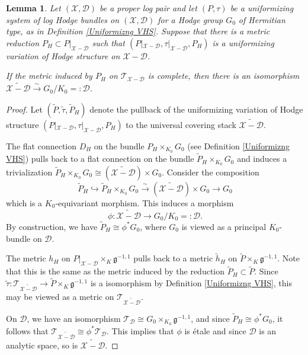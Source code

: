 \documentclass[a4paper]{amsart}
\newtheorem{lemma}[theorem]{Lemma}
\theoremstyle{definition}
\begin{document}
\begin{lemma}\label{Completeness-lem}
Let $(\mathscr{X},\mathscr{D})$ be a proper log pair and let $(P,\tau)$ be a uniformizing system of log Hodge bundles on $(\mathscr{X},\mathscr{D})$ for a Hodge group $G_0$ of Hermitian type, as in Definition \ref{Uniformizng VHS}. Suppose that there is a metric reduction $P_H\subset P|_{\mathscr{X}-\mathscr{D}}$ such that $(P|_{\mathscr{X}-\mathscr{D}},\tau|_{\mathscr{X}-\mathscr{D}},P_H)$ is a uniformizing variation of Hodge structure on $\mathscr{X}-\mathscr{D}$.

If the metric induced by $P_H$ on $\mathcal{T}_{\mathscr{X}-\mathscr{D}}$ is complete, then there is an isomorphism $\widetilde{\mathscr{X}-\mathscr{D}}\xrightarrow{\sim}G_0/K_0=:\mathcal{D}$.
\end{lemma}
\begin{proof}
Let $(\widetilde{P},\widetilde{\tau},\widetilde{P}_H)$ denote the pullback of the uniformizing variation of Hodge structure $(P|_{\mathscr{X}-\mathscr{D}},\tau|_{\mathscr{X}-\mathscr{D}},P_H)$ to the universal covering stack $\widetilde{\mathscr{X}-\mathscr{D}}$.

The flat connection $D_H$ on the bundle $P_H\times_{K_0}G_0$ (see Definition \ref{Uniformizng VHS}) pulls back to a flat connection on the bundle $\widetilde{P}_H\times_{K_0}G_0$ and induces a trivialization $\widetilde{P}_H\times_{K_0}G_0\cong(\widetilde{\mathscr{X}-\mathscr{D}})\times G_0$. Consider the composition
\[
\widetilde{P}_H\hookrightarrow\widetilde{P}_H\times_{K_0}G_0\xrightarrow{\sim}(\widetilde{\mathscr{X}-\mathscr{D}})\times G_0\to G_0
\]
which is a $K_0$-equivariant morphism. This induces a morphism 
\[
\phi:\widetilde{\mathscr{X}-\mathscr{D}}\to G_0/K_0=:\mathcal{D}.
\] 
By construction, we have $\widetilde{P}_H\cong\phi^*G_0$, where $G_0$ is viewed as a principal $K_0$-bundle on $\mathcal{D}$.

The metric $h_H$ on $P|_{\mathscr{X}-\mathscr{D}}\times_K\mathfrak{g}^{-1,1}$ pulls back to a metric $\widetilde{h}_H$ on $\widetilde{P}\times_K\mathfrak{g}^{-1,1}$. Note that this is the same as the metric induced by the reduction $\widetilde{P}_H\subset\widetilde{P}$. Since $\widetilde{\tau}:\mathcal{T}_{\widetilde{\mathscr{X}-\mathscr{D}}}\to\widetilde{P}\times_K\mathfrak{g}^{-1,1}$ is a isomorphism by Definition \ref{Uniformizng VHS}, this may be viewed as a metric on $\mathcal{T}_{\widetilde{\mathscr{X}-\mathscr{D}}}$.

On $\mathcal{D}$, we have an isomorphism $\mathcal{T}_{\mathcal{D}}\cong G_0\times_{K_0}\mathfrak{g}^{-1,1}$, and since $\widetilde{P}_H\cong\phi^*G_0$, it follows that $\mathcal{T}_{\widetilde{\mathscr{X}-\mathscr{D}}}\cong\phi^*\mathcal{T}_{\mathcal{D}}$. This implies that $\phi$ is \'etale and since $\mathcal{D}$ is an analytic space, so is $\widetilde{\mathscr{X}-\mathscr{D}}$.


\end{proof}
\end{document}
